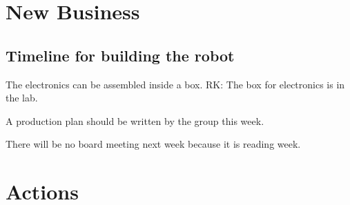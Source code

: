 \documentclass[a4paper,11pt,twoside,class=meetingmins,crop=false]{standalone}
\begin{document}
\section{New Business}
\begin{items}
    \subsection{Timeline for building the robot}
        \item The electronics can be assembled inside a box. RK: The box for electronics is in the lab.
        \item A production plan should be written by the group this week.
\end{items}

\vspace{1em}
There will be no board meeting next week because it is reading week.
\vspace{1em}

\section{Actions}
\begin{items}
\end{items}
\end{document}
